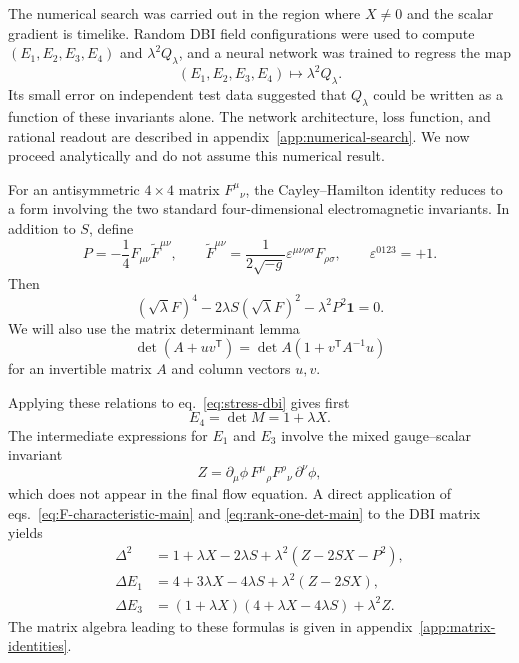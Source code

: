 \documentclass[a4paper,11pt]{article}
\numberwithin{equation}{section}
\newcommand{\Id}{\mathbf 1}
\newcommand{\eps}{\varepsilon}
\begin{document}
The numerical search was carried out in the region where $X\neq0$ and the scalar gradient is timelike. Random DBI field configurations were used to compute $(E_1,E_2,E_3,E_4)$ and $\lambda^2Q_\lambda$, and a neural network was trained to regress the map
\begin{equation}
 (E_1,E_2,E_3,E_4)\longmapsto \lambda^2Q_\lambda.
 \label{eq:numerical-clue}
\end{equation}
Its small error on independent test data suggested that $Q_\lambda$ could be written as a function of these invariants alone. The network architecture, loss function, and rational readout are described in appendix~\ref{app:numerical-search}. We now proceed analytically and do not assume this numerical result.

For an antisymmetric $4\times4$ matrix $F^\mu{}_{\nu}$, the Cayley--Hamilton identity reduces to a form involving the two standard four-dimensional electromagnetic invariants. In addition to $S$, define
\begin{equation}
 P=-\frac14F_{\mu\nu}\widetilde F^{\mu\nu},
 \qquad
 \widetilde F^{\mu\nu}
 =\frac{1}{2\sqrt{-g}}\eps^{\mu\nu\rho\sigma}F_{\rho\sigma},
 \qquad \eps^{0123}=+1.
 \label{eq:P-definition}
\end{equation}
Then
\begin{equation}
 (\sqrt\lambda F)^4-2\lambda S(\sqrt\lambda F)^2-\lambda^2P^2\Id=0.
 \label{eq:F-characteristic-main}
\end{equation}
We will also use the matrix determinant lemma
\begin{equation}
 \det(A+uv^{\mathsf T})=\det A\left(1+v^{\mathsf T}A^{-1}u\right)
 \label{eq:rank-one-det-main}
\end{equation}
for an invertible matrix $A$ and column vectors $u,v$.

Applying these relations to eq.~\eqref{eq:stress-dbi} gives first
\begin{equation}
 E_4=\det M=1+\lambda X.
 \label{eq:E4}
\end{equation}
The intermediate expressions for $E_1$ and $E_3$ involve the mixed gauge--scalar invariant
\begin{equation}
 Z=\partial_\mu\phi\,F^\mu{}_{\rho}F^\rho{}_{\nu}\,\partial^\nu\phi,
 \label{eq:Z-definition}
\end{equation}
which does not appear in the final flow equation. A direct application of eqs.~\eqref{eq:F-characteristic-main} and \eqref{eq:rank-one-det-main} to the DBI matrix yields
\begin{align}
 \Delta^2
 &=1+\lambda X-2\lambda S
 +\lambda^2\left(Z-2SX-P^2\right),
 \label{eq:delta-fields}\\
 \Delta E_1
 &=4+3\lambda X-4\lambda S+\lambda^2(Z-2SX),
 \label{eq:E1-fields}\\
 \Delta E_3
 &=(1+\lambda X)(4+\lambda X-4\lambda S)+\lambda^2Z.
 \label{eq:E3-fields}
\end{align}
The matrix algebra leading to these formulas is given in appendix~\ref{app:matrix-identities}.
\end{document}
